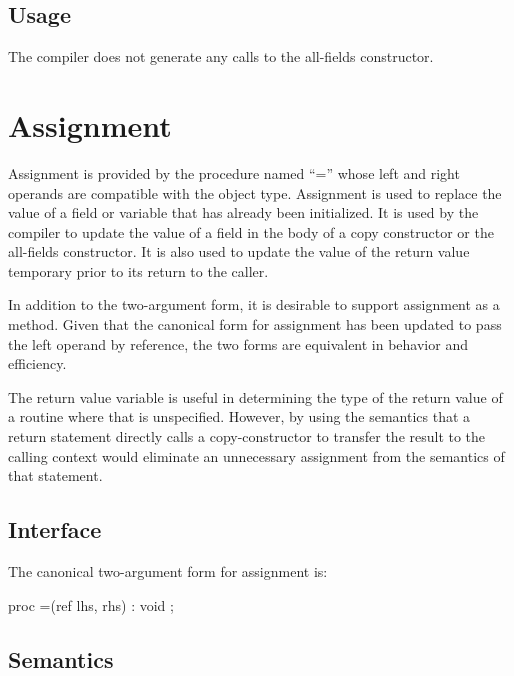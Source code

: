 \subsection{Usage}

The compiler does not generate any calls to the all-fields constructor.



\section{Assignment}

Assignment is provided by the procedure named ``='' whose left and right
operands are compatible with the object type.  Assignment is used to replace the
value of a field or variable that has already been initialized.  It is used by
the compiler to update the value of a field in the body of a copy constructor or
the all-fields constructor.  It is also used to update the value of the return
value temporary prior to its return to the caller.

\begin{future}

In addition to the two-argument form, it is desirable to support assignment as a
method.  Given that the canonical form for assignment has been updated to pass
the left operand by reference, the two forms are equivalent in behavior and
efficiency.

The return value variable is useful in determining the type of the return value
of a routine where that is unspecified.  However, by using the semantics that a
return statement directly calls a copy-constructor to transfer the result to the
calling context would eliminate an unnecessary assignment from the semantics of
that statement.

\end{future}

\subsection{Interface}

The canonical two-argument form for assignment is:
\begin{chapel}
proc =(ref lhs, rhs) : void ;
\end{chapel}

\subsection{Semantics}

